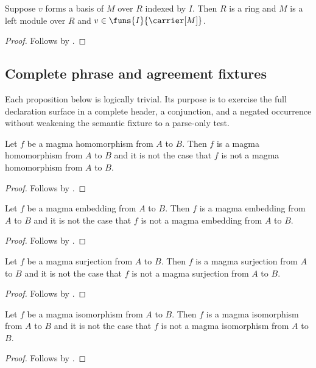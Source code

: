 \begin{proposition}\label{spike_phrase_basis_guards}
    Suppose $v$ forms a basis of $M$ over $R$ indexed by $I$.
    Then $R$ is a ring and $M$ is a left module over $R$ and
        $v\in\funs{I}{\carrier[M]}$.
\end{proposition}
\begin{proof}
    Follows by .
\end{proof}

\subsection{Complete phrase and agreement fixtures}

Each proposition below is logically trivial.  Its purpose is to exercise the
full declaration surface in a complete header, a conjunction, and a negated
occurrence without weakening the semantic fixture to a parse-only test.

\begin{proposition}\label{spike_use_magma_hom}
    Let $f$ be a magma homomorphism from $A$ to $B$.
    Then $f$ is a magma homomorphism from $A$ to $B$ and it is not the case
        that $f$ is not a magma homomorphism from $A$ to $B$.
\end{proposition}
\begin{proof} Follows by \auto. \end{proof}

\begin{proposition}\label{spike_use_magma_embedding}
    Let $f$ be a magma embedding from $A$ to $B$.
    Then $f$ is a magma embedding from $A$ to $B$ and it is not the case
        that $f$ is not a magma embedding from $A$ to $B$.
\end{proposition}
\begin{proof} Follows by \auto. \end{proof}

\begin{proposition}\label{spike_use_magma_surjection}
    Let $f$ be a magma surjection from $A$ to $B$.
    Then $f$ is a magma surjection from $A$ to $B$ and it is not the case
        that $f$ is not a magma surjection from $A$ to $B$.
\end{proposition}
\begin{proof} Follows by \auto. \end{proof}

\begin{proposition}\label{spike_use_magma_isomorphism}
    Let $f$ be a magma isomorphism from $A$ to $B$.
    Then $f$ is a magma isomorphism from $A$ to $B$ and it is not the case
        that $f$ is not a magma isomorphism from $A$ to $B$.
\end{proposition}
\begin{proof} Follows by \auto. \end{proof}

